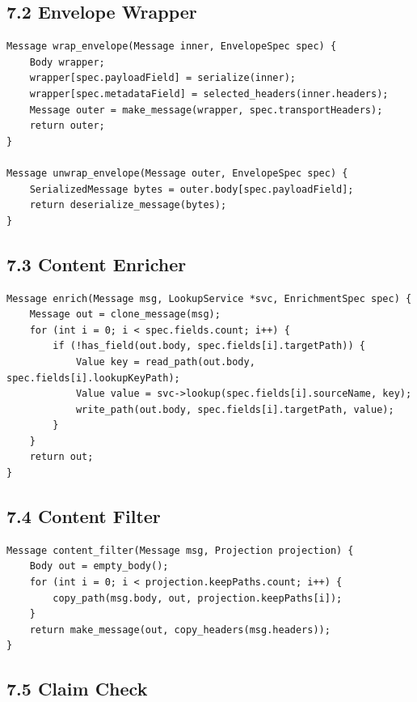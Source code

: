 \documentclass[11pt]{article}
\begin{document}
\subsection{7.2 Envelope Wrapper}\label{envelope-wrapper}

\begin{verbatim}
Message wrap_envelope(Message inner, EnvelopeSpec spec) {
    Body wrapper;
    wrapper[spec.payloadField] = serialize(inner);
    wrapper[spec.metadataField] = selected_headers(inner.headers);
    Message outer = make_message(wrapper, spec.transportHeaders);
    return outer;
}

Message unwrap_envelope(Message outer, EnvelopeSpec spec) {
    SerializedMessage bytes = outer.body[spec.payloadField];
    return deserialize_message(bytes);
}
\end{verbatim}

\subsection{7.3 Content Enricher}\label{content-enricher}

\begin{verbatim}
Message enrich(Message msg, LookupService *svc, EnrichmentSpec spec) {
    Message out = clone_message(msg);
    for (int i = 0; i < spec.fields.count; i++) {
        if (!has_field(out.body, spec.fields[i].targetPath)) {
            Value key = read_path(out.body, spec.fields[i].lookupKeyPath);
            Value value = svc->lookup(spec.fields[i].sourceName, key);
            write_path(out.body, spec.fields[i].targetPath, value);
        }
    }
    return out;
}
\end{verbatim}

\subsection{7.4 Content Filter}\label{content-filter}

\begin{verbatim}
Message content_filter(Message msg, Projection projection) {
    Body out = empty_body();
    for (int i = 0; i < projection.keepPaths.count; i++) {
        copy_path(msg.body, out, projection.keepPaths[i]);
    }
    return make_message(out, copy_headers(msg.headers));
}
\end{verbatim}

\subsection{7.5 Claim Check}\label{claim-check}
\end{document}
